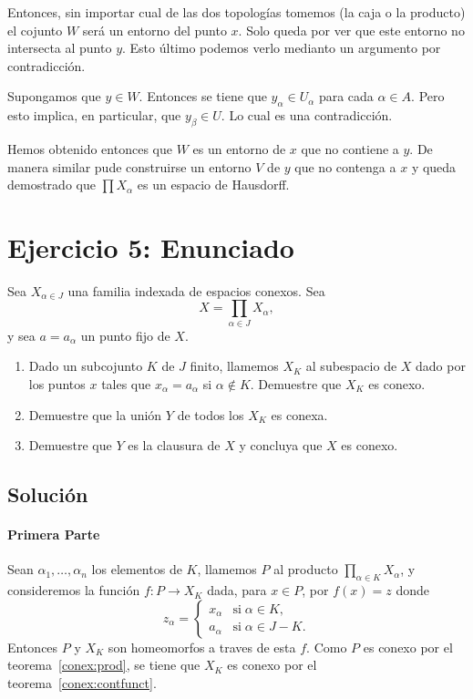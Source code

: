 \documentclass[fleqn,leqno,11pt,letterpaper,final]{article}
\begin{document}
Entonces, sin importar cual de las dos topologías tomemos (la caja o la producto)
el cojunto $W$ será un entorno del punto $x$. Solo queda por ver que este entorno
no intersecta al punto $y$. Esto último podemos verlo medianto un argumento por
contradicción.

Supongamos que $y\in W$. Entonces se tiene que $y_\alpha\in U_\alpha$ para cada $\alpha\in A$.
Pero esto implica, en particular, que $y_{\beta}\in U$.
Lo cual es una contradicción.

Hemos obtenido entonces que $W$ es un entorno de $x$ que no contiene a $y$.
De manera similar pude construirse un entorno $V$ de $y$ que no contenga a $x$
y queda demostrado que $\prod X_\alpha$ es un espacio de Hausdorff.
\section{Ejercicio 5: Enunciado}

\hspace{-.6em}\footnotemark Sea $X_{\alpha\in J}$ una familia indexada de espacios conexos. Sea
\[
	X=\prod_{\alpha\in J} X_\alpha,
\]
y sea $a=a_\alpha$ un punto fijo de $X$.
\begin{enumerate}
	\item Dado un subcojunto $K$ de $J$ finito, llamemos $X_K$ al subespacio de $X$ dado por los puntos
		$x$ tales que $x_\alpha=a_\alpha$ si $\alpha\not\in K$. Demuestre que $X_K$ es conexo.
	\item Demuestre que la unión $Y$ de todos los $X_K$ es conexa.
	\item Demuestre que $Y$ es la clausura de $X$ y concluya que $X$ es conexo.
\end{enumerate}

\subsection{Solución}
\paragraph{Primera Parte}
Sean $\alpha_1,\dots,\alpha_n$ los elementos de $K$, llamemos $P$ al producto $\prod_{\alpha\in K}X_\alpha$,
y consideremos la función 
$f:P\to X_K$ dada, para $x\in P$, por $f(x)=z$ donde
\[
	z_\alpha= \begin{cases}
		x_\alpha &\text{si}\; \alpha\in K,\\
		a_\alpha &\text{si}\; \alpha\in J-K.
	\end{cases}
\]
Entonces $P$ y $X_K$ son homeomorfos a traves de esta $f$. Como $P$ es conexo por
el teorema~\ref{conex:prod}, se tiene que $X_K$ es conexo por el teorema~\ref{conex:contfunct}.
\end{document}
